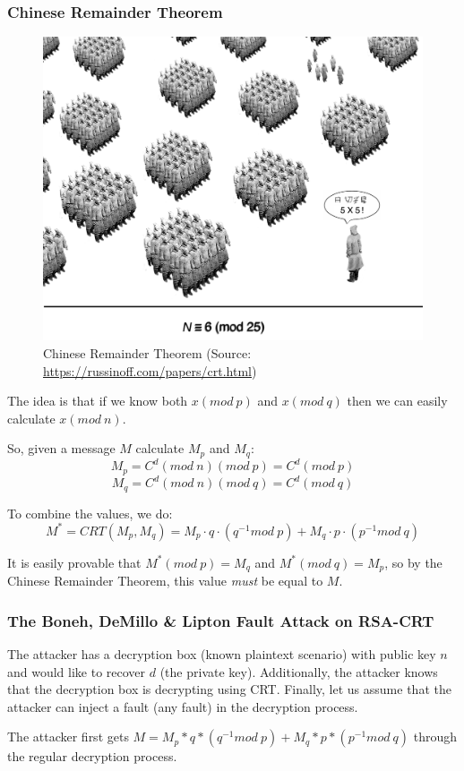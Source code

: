 \subsubsection{Chinese Remainder Theorem} \label{subsubsec:chinese_remainder_theorem}
\begin{figure}[!ht]
	\centering
	\includegraphics[width=0.5\linewidth]{images/ch9/soldiers.jpeg}
	\caption{Chinese Remainder Theorem (Source: \url{https://russinoff.com/papers/crt.html})}
	\label{fig:chinese_remainder}
\end{figure}
The idea is that if we know both $x (mod\ p)$ and $x (mod\ q)$ then we can easily calculate $x (mod\ n)$.

So, given a message $M$ calculate $M_p$ and $M_q$:
\[M_p = C^d (mod\ n)(mod\ p) = C^d (mod\ p)\]
\[M_q = C^d (mod\ n)(mod\ q) = C^d (mod\ q)\]

To combine the values, we do:
\[
	M^* = CRT(M_p, M_q) = M_p \cdot q \cdot (q^{-1} mod\ p) + M_q \cdot p \cdot (p^{-1} mod\ q)
\]

It is easily provable that \(M^*(mod\ p)=M_q\) and \(M^*(mod\ q)=M_p\), so by the Chinese Remainder Theorem, this value \emph{must} be equal to $M$.

\subsubsection{The Boneh, DeMillo \& Lipton Fault Attack on RSA-CRT \cite{boneh}} \label{subsubsec:the_boneh_demillo_lipton_fault_attack_on_rsa_crt}

The attacker has a decryption box (known plaintext scenario) with public key $n$ and would like to recover $d$ (the private key). Additionally, the attacker knows that the decryption box is decrypting using CRT. Finally, let us assume that the attacker can inject a fault (any fault) in the decryption process.

The attacker first gets \(M = M_p*q*(q^{-1} mod\ p) + M_q*p*(p^{-1} mod\ q)\)
through the regular decryption process.

